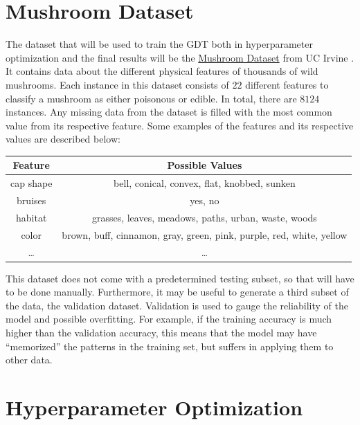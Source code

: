 \documentclass[12pt]{article}
\begin{document}
\section{Mushroom Dataset}

The dataset that will be used to train the GDT both in hyperparameter optimization and the final results will be the \href{https://archive-beta.ics.uci.edu/ml/datasets/mushroom}{Mushroom Dataset} from UC Irvine \cite{misc_mushroom_73}. It contains data about the different physical features of thousands of wild mushrooms. Each instance in this dataset consists of $22$ different features to classify a mushroom as either poisonous or edible. In total, there are $8124$ instances. Any missing data from the dataset is filled with the most common value from its respective feature. Some examples of the features and its respective values are described below:

\begin{center}
    \begin{tabular}{|c|c|}
        \hline
        Feature & Possible Values \\
        \hline \hline
        cap shape & bell, conical, convex, flat, knobbed, sunken \\
        \hline
        bruises & yes, no \\
        \hline
        habitat & grasses, leaves, meadows, paths, urban, waste, woods \\
        \hline
        color & brown, buff, cinnamon, gray, green, pink, purple, red, white, yellow \\
        \hline
        \dots & \dots \\
        \hline
    \end{tabular}
\end{center}

This dataset does not come with a predetermined testing subset, so that will have to be done manually. Furthermore, it may be useful to generate a third subset of the data, the validation dataset. Validation is used to gauge the reliability of the model and possible overfitting. For example, if the training accuracy is much higher than the validation accuracy, this means that the model may have ``memorized'' the patterns in the training set, but suffers in applying them to other data.

\section{Hyperparameter Optimization}
\end{document}
